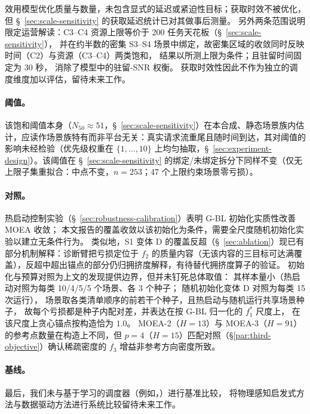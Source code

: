 \documentclass[preprint,12pt,authoryear]{elsarticle}
\begin{document}
效用模型优化质量与数量，未包含显式的延迟或紧迫性目标；获取时效不被优化，但 \S~\ref{sec:scale-sensitivity} 的获取延迟统计已对其做事后测量。
另外两条范围说明限定运营解读：C3--C4 资源上限等价于 200 任务天花板（\S~\ref{sec:scale-sensitivity}），
并在约半数的密集 S3--S4 场景中绑定，故密集区域的收敛同时反映时间（C2）与资源（C3--C4）两类饱和，
结果以所测上限为条件；且驻留时间固定为 30 秒，
消除了模型中的驻留-SNR 权衡。
获取时效性因此不作为独立的调度维度加以评估，留待未来工作。

\paragraph{阈值。}
该饱和阈值本身（$N_{50} \approx 51$，\S~\ref{sec:scale-sensitivity}）在本合成、静态场景族内估计，应读作场景族特有而非平台无关：真实请求流重尾且随时间到达，其对阈值的影响未经检验（优先级权重在 $\{1,\dots,10\}$ 上均匀抽取，\S~\ref{sec:experiment-design}）。该阈值在 \S~\ref{sec:scale-sensitivity} 的绑定/未绑定拆分下同样不变（仅无上限子集重拟合：中点不变，$n=253$；47 个上限约束场景零亏损）。

\paragraph{对照。}
热启动控制实验（\S~\ref{sec:robustness-calibration}）表明 G-BL 初始化实质性改善 MOEA 收敛；
本文报告的覆盖收敛以该初始化为条件，需要全尺度随机初始化实验以建立无条件行为。
类似地，S1 变体 D 的覆盖反超（\S~\ref{sec:ablation}）现已有部分机制解释：诊断臂把亏损定位于 $f_2$ 的质量内容（无该内容的三目标可达满覆盖），反超中超出锚点的部分仍归拥挤度解释，有待替代拥挤度算子的验证。
初始化与预算对照为上文的发现提供边界，但并未钉死总体取值：
其样本量小（热启动对照为每类 10/4/5/5 个场景、各 3 个种子；
随机初始化变体 D 对照为每类 15 次运行），
场景取各类清单顺序的前若干个种子，且热启动与随机运行共享场景种子，
故每个亏损都是种子内配对差，并表达在按 G-BL 归一化的 $f_1^*$ 尺度上，
在该尺度上贪心锚点按构造恰为 $1.0$。
MOEA-2（$H=13$）与 MOEA-3（$H=91$）的参考点数量在构造上不同，但 $p=4$（$H=15$）匹配对照（\S\ref{par:third-objective}）确认稀疏密度的 $f_3$ 增益非参考方向密度所致。

\paragraph{基线。}
最后，我们未与基于学习的调度器（例如，\citet{Chen2025NeuralPriority}）进行基准比较，
将物理感知启发式方法与数据驱动方法进行系统比较留待未来工作。

\end{document}
